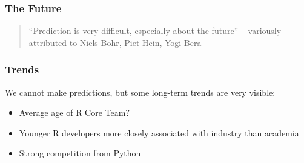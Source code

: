 \documentclass[svgnames, aspectratio=169]{beamer}
\begin{document}
\begin{frame}
  \frametitle{The Future}

  \begin{quote}
    ``Prediction is very difficult, especially about the future''
    -- variously attributed to Niels Bohr, Piet Hein, Yogi Bera
  \end{quote}

\end{frame}

\begin{frame}
  \frametitle{Trends}

  We cannot make predictions, but some long-term trends are very visible:
  \begin{itemize}
  \item Average age of R Core Team?
  \item Younger R developers more closely associated with industry
    than academia
  \item Strong competition from Python
  \end{itemize}
\end{frame}

%
%

%
%
\end{document}
